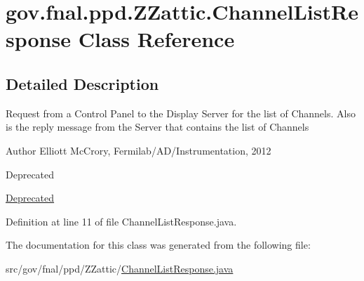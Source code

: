 \hypertarget{classgov_1_1fnal_1_1ppd_1_1ZZattic_1_1ChannelListResponse}{\section{gov.\-fnal.\-ppd.\-Z\-Zattic.\-Channel\-List\-Response Class Reference}
\label{classgov_1_1fnal_1_1ppd_1_1ZZattic_1_1ChannelListResponse}
}


\subsection{Detailed Description}
Request from a Control Panel to the Display Server for the list of Channels. Also is the reply message from the Server that contains the list of Channels

\begin{DoxyAuthor}{Author}
Elliott Mc\-Crory, Fermilab/\-A\-D/\-Instrumentation, 2012 
\end{DoxyAuthor}
\begin{DoxyRefDesc}{Deprecated}
\item[\hyperlink{deprecated__deprecated000010}{Deprecated}]\end{DoxyRefDesc}


Definition at line 11 of file Channel\-List\-Response.\-java.



The documentation for this class was generated from the following file\-:\begin{DoxyCompactItemize}
\item 
src/gov/fnal/ppd/\-Z\-Zattic/\hyperlink{ChannelListResponse_8java}{Channel\-List\-Response.\-java}\end{DoxyCompactItemize}
